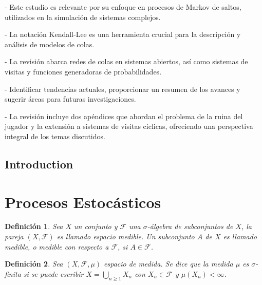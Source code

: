 \documentclass{article}
\newtheorem{Def}{Definición}[section]
\renewcommand{\abstractname}{Resumen}
\numberwithin{equation}{section}
\begin{document}
- Este estudio es relevante por su enfoque en procesos de Markov de saltos, utilizados en la simulación de sistemas complejos.

- La notación Kendall-Lee es una herramienta crucial para la descripción y análisis de modelos de colas.

- La revisión abarca redes de colas en sistemas abiertos, así como sistemas de visitas y funciones generadoras de probabilidades.

- Identificar tendencias actuales, proporcionar un resumen de los avances y sugerir áreas para futuras investigaciones.

- La revisión incluye dos apéndices que abordan el problema de la ruina del jugador y la extensión a sistemas de visitas cíclicas, ofreciendo una perspectiva integral de los temas discutidos.



\begin{otherlanguage}{english}
\renewcommand{\abstractname}{Abstract} %
\section*{Introduction}
\end{otherlanguage}


\section{Procesos Estoc\'asticos}\label{Procesos.Estocasticos}

\begin{Def}
Sea $X$ un conjunto y $\mathcal{F}$ una $\sigma$-\'algebra de subconjuntos de $X$, la pareja $\left(X,\mathcal{F}\right)$ es llamado espacio medible. Un subconjunto $A$ de $X$ es llamado medible, o medible con respecto a $\mathcal{F}$, si $A\in\mathcal{F}$.
\end{Def}

\begin{Def}
Sea $\left(X,\mathcal{F},\mu\right)$ espacio de medida. Se dice que la medida $\mu$ es $\sigma$-finita si se puede escribir $X=\bigcup_{n\geq1}X_{n}$ con $X_{n}\in\mathcal{F}$ y $\mu\left(X_{n}\right)<\infty$.
\end{Def}
\end{document}
